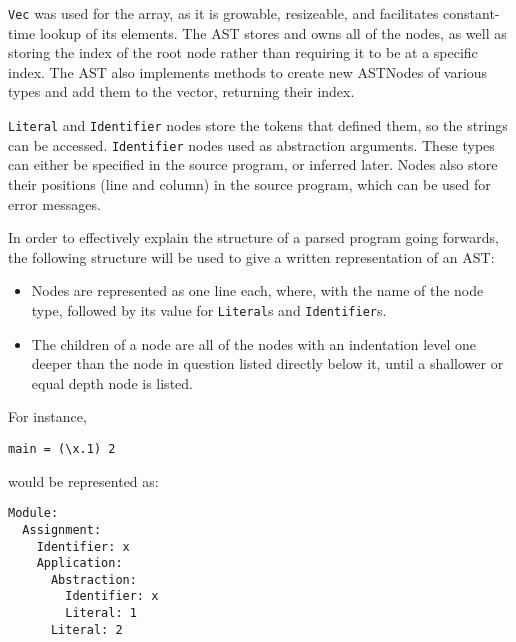\documentclass[
author={Kiran Sturt},
degree={BSc},
title={Implementing a Step by Step Evaluator for a Simple Functional Programming language},
unit={COMS30045},]{dissertation}
\theoremstyle{definition}
\theoremstyle{break}
\theoremstyle{definition}
\begin{document}
\verb|Vec| was used for the array, as it is growable, resizeable, and facilitates constant-time lookup of its elements. The AST stores and owns all of the nodes, as well as storing the index of the root node rather than requiring it to be at a specific index. The AST also implements methods to create new ASTNodes of various types and add them to the vector, returning their index.

\verb|Literal| and \verb|Identifier| nodes store the tokens that defined them, so the strings can be accessed. \verb|Identifier| nodes used as abstraction arguments. These types can either be specified in the source program, or inferred later. Nodes also store their positions (line and column) in the source program, which can be used for error messages. 

In order to effectively explain the structure of a parsed program going forwards, the following structure will be used to give a written representation of an AST:
\begin{itemize}
    \item Nodes are represented as one line each, where, with the name of the node type, followed by its value for \verb|Literal|s and \verb|Identifier|s.
    \item The children of a node are all of the nodes with an indentation level one deeper than the node in question listed directly below it, until a shallower or equal depth node is listed. 
\end{itemize}
\filbreak\noindent
For instance, 
\begin{lstlisting}
main = (\x.1) 2
\end{lstlisting}
would be represented as:
\begin{lstlisting}
Module:
  Assignment:
    Identifier: x
    Application:
      Abstraction:
        Identifier: x
        Literal: 1
      Literal: 2
\end{lstlisting}
\end{document}
